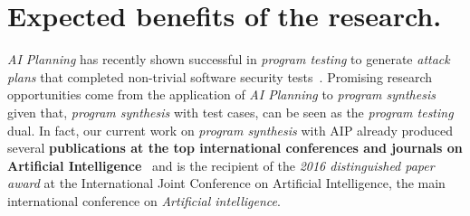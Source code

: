 \documentclass[10pt,a4paper]{paper}
\begin{document}
\section{Expected benefits of the research.}
\label{subsec:beneficios}
{\em AI Planning} has recently shown successful in {\em program testing} to generate {\em attack plans} that completed non-trivial software security tests~\cite{hoffmann2015simulated,steinmetz2016revisiting,shmaryahu2016constructing,steinmetz2016goal}. Promising research opportunities come from the application of {\em AI Planning} to {\em program synthesis} given that, {\em program synthesis} with test cases, can be seen as the {\em program testing} dual. In fact, our current work on {\em program synthesis} with AIP already produced several {\bf publications at the top international conferences and journals on Artificial Intelligence}~\cite{segovia2017generating,sergio:aprogramingb:ijcai16,sergio:aprograming:ijcai16,sergio:aprograming:icaps16,segovia:FSC:JAIR2018,segovia:programs:AIJ19} and is the recipient of the {\it 2016 distinguished paper award} at the International Joint Conference on Artificial Intelligence, the main international conference on {\em Artificial intelligence}. 
\end{document}
